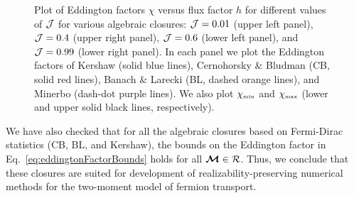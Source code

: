\begin{figure}[h]
\begin{tabular}{cc}
  \end{tabular}
   \caption{Plot of Eddington factors $\chi$ versus flux factor $h$ for different values of $\mathcal{J}$ for various algebraic closures: $\mathcal{J}=0.01$ (upper left panel), $\mathcal{J}=0.4$ (upper right panel), $\mathcal{J}=0.6$ (lower left panel), and $\mathcal{J}=0.99$ (lower right panel).  In each panel we plot the Eddington factors of Kershaw (solid blue lines), Cernohorsky \& Bludman (CB, solid red lines), Banach \& Larecki (BL, dashed orange lines), and Minerbo (dash-dot purple lines).  We also plot $\chi_{\mbox{\tiny min}}$ and $\chi_{\mbox{\tiny max}}$ (lower and upper solid black lines, respectively).}
  \label{fig:EddingtonFactorsWithDifferentClosure}
\end{figure}
We have also checked that for all the algebraic closures based on Fermi-Dirac statistics (CB, BL, and Kershaw), the bounds on the Eddington factor in Eq.~\eqref{eq:eddingtonFactorBounds} holds for all $\boldsymbol{\mathcal{M}}\in\mathcal{R}$.  
Thus, we conclude that these closures are suited for development of realizability-preserving numerical methods for the two-moment model of fermion transport.  


